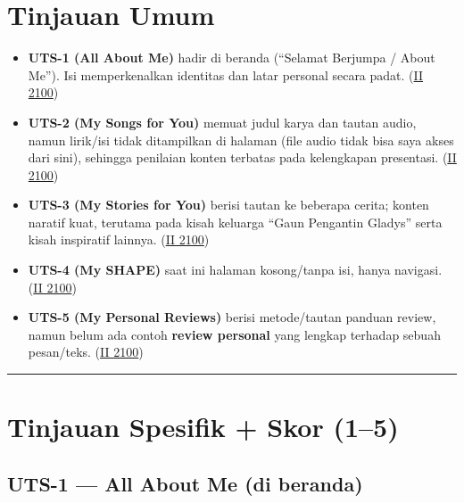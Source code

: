 \documentclass[
  letterpaper,
  DIV=11,
  numbers=noendperiod]{scrreprt}
\providecommand{\tightlist}{%
  \setlength{\itemsep}{0pt}\setlength{\parskip}{0pt}}\usepackage{longtable,booktabs,array}
\begin{document}
\section{Tinjauan Umum}\label{tinjauan-umum}

\begin{itemize}
\tightlist
\item
  \textbf{UTS-1 (All About Me)} hadir di beranda (``Selamat Berjumpa /
  About Me''). Isi memperkenalkan identitas dan latar personal secara
  padat. (\href{https://ii-2100.github.io/all-about-me/}{II 2100})
\item
  \textbf{UTS-2 (My Songs for You)} memuat judul karya dan tautan audio,
  namun lirik/isi tidak ditampilkan di halaman (file audio tidak bisa
  saya akses dari sini), sehingga penilaian konten terbatas pada
  kelengkapan presentasi.
  (\href{https://ii-2100.github.io/all-about-me/My_Song_for_You/index.html}{II
  2100})
\item
  \textbf{UTS-3 (My Stories for You)} berisi tautan ke beberapa cerita;
  konten naratif kuat, terutama pada kisah keluarga ``Gaun Pengantin
  Gladys'' serta kisah inspiratif lainnya.
  (\href{https://ii-2100.github.io/all-about-me/My_Stories_for_You/index.html}{II
  2100})
\item
  \textbf{UTS-4 (My SHAPE)} saat ini halaman kosong/tanpa isi, hanya
  navigasi.
  (\href{https://ii-2100.github.io/all-about-me/My_Shapes/index.html}{II
  2100})
\item
  \textbf{UTS-5 (My Personal Reviews)} berisi metode/tautan panduan
  review, namun belum ada contoh \textbf{review personal} yang lengkap
  terhadap sebuah pesan/teks.
  (\href{https://ii-2100.github.io/all-about-me/My_Personal_Reviews/index.html}{II
  2100})
\end{itemize}

\begin{center}\rule{0.5\linewidth}{0.5pt}\end{center}

\section{Tinjauan Spesifik + Skor
(1--5)}\label{tinjauan-spesifik-skor-15}

\subsection{UTS-1 --- All About Me (di
beranda)}\label{uts-1-all-about-me-di-beranda}
\end{document}
